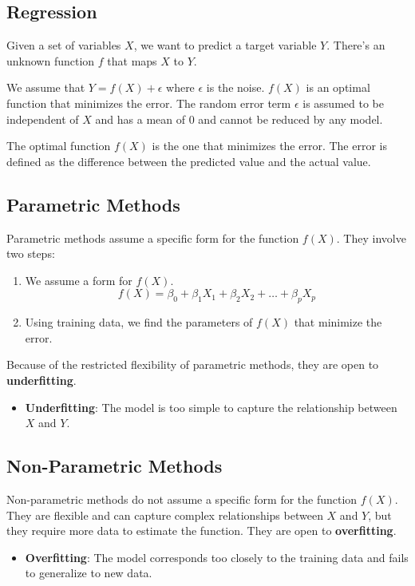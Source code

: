 \subsection*{Regression}
Given a set of variables $X$, we want to predict a target variable $Y$. There's an unknown function $f$ that maps $X$ to $Y$.

We assume that $Y = f(X) + \epsilon$ where $\epsilon$ is the noise. $f(X)$ is an optimal function that minimizes the error.
The random error term $\epsilon$ is assumed to be independent of $X$ and has a mean of 0 and cannot be reduced by any model.

The optimal function $f(X)$ is the one that minimizes the error. The error is defined as the difference between the predicted value and the actual value.

\subsection*{Parametric Methods}
Parametric methods assume a specific form for the function $f(X)$. They involve two steps:
\begin{enumerate}[noitemsep]
    \item We assume a form for $f(X)$.
    $$f(X) = \beta_0 + \beta_1 X_1 + \beta_2 X_2 + \ldots + \beta_p X_p$$
    
    \item Using training data, we find the parameters of $f(X)$ that minimize the error.
\end{enumerate}

Because of the restricted flexibility of parametric methods, they are open to \textbf{underfitting}.

\begin{itemize}[noitemsep]
    \item \textbf{Underfitting}: The model is too simple to capture the relationship between $X$ and $Y$.
\end{itemize}

\subsection*{Non-Parametric Methods}
Non-parametric methods do not assume a specific form for the function $f(X)$. They are flexible and can capture complex relationships between $X$ and $Y$, but they require more data to estimate the function. They are open to \textbf{overfitting}.

\begin{itemize}[noitemsep]
    \item \textbf{Overfitting}: The model corresponds too closely to the training data and fails to generalize to new data.
\end{itemize}

